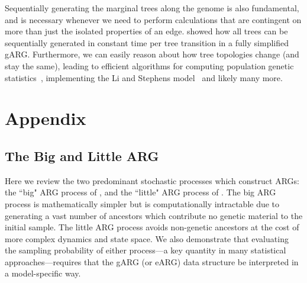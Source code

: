 \documentclass{article}
\begin{document}
Sequentially generating the marginal trees along the genome
is also fundamental, and is necessary whenever we need to
perform calculations that are contingent on more than just the
isolated properties of an edge. \cite{kelleher2016efficient}
showed how all trees can be sequentially generated in
constant time per tree transition in a fully simplified gARG.
Furthermore, we can easily reason about how tree topologies
change (and stay the same), leading to efficient algorithms
for computing population genetic
statistics~\citep{kelleher2016efficient,kelleher2018efficient},
implementing the Li and Stephens
model~\citep{kelleher2019inferring,wohns2022unified}
and likely many more.





\setcounter{secnumdepth}{2} %

\appendix
\section*{Appendix}

\subsection*{The Big and Little ARG}
\label{app-big-and-little-arg}

Here we review the two predominant stochastic processes which construct ARGs:
the ``big" ARG process of \cite{griffiths1997ancestral}, and the ``little" ARG process of
 \cite{hudson1983properties}. The big ARG process is mathematically simpler
 but is computationally intractable due to generating a vast number of ancestors
 which contribute no genetic material to the initial sample.
The little ARG process avoids non-genetic ancestors at the cost of more complex
dynamics and state space. We also demonstrate that evaluating the sampling probability
of either process---a key quantity in many statistical approaches---requires that the
gARG (or eARG) data structure be interpreted in a model-specific way.
\end{document}
